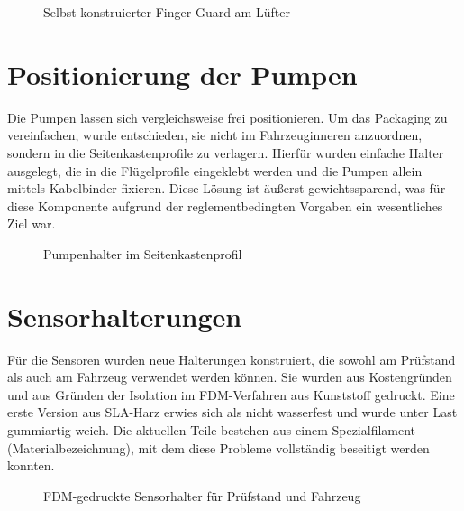 \begin{figure}[htbp]
    \centering
    \caption{Selbst konstruierter Finger Guard am Lüfter}
    \label{fig:finger_guard}
\end{figure}

\section{Positionierung der Pumpen}
\label{sec:pumpen_position}

Die Pumpen lassen sich vergleichsweise frei positionieren. Um das Packaging
zu vereinfachen, wurde entschieden, sie nicht im Fahrzeuginneren
anzuordnen, sondern in die Seitenkastenprofile zu verlagern. Hierfür wurden
einfache Halter ausgelegt, die in die Flügelprofile eingeklebt werden und
die Pumpen allein mittels Kabelbinder fixieren. Diese Lösung ist
äußerst gewichtssparend, was für diese Komponente aufgrund der
reglementbedingten Vorgaben ein wesentliches Ziel war.

\begin{figure}[htbp]
    \centering
    \caption{Pumpenhalter im Seitenkastenprofil}
    \label{fig:pumpenhalter}
\end{figure}

\section{Sensorhalterungen}
\label{sec:sensorhalterungen}

Für die Sensoren wurden neue Halterungen konstruiert, die sowohl am
Prüfstand als auch am Fahrzeug verwendet werden können. Sie wurden aus
Kostengründen und aus Gründen der Isolation im FDM-Verfahren aus Kunststoff
gedruckt. Eine erste Version aus SLA-Harz erwies sich als nicht wasserfest
und wurde unter Last gummiartig weich. Die aktuellen Teile bestehen aus
einem Spezialfilament (Materialbezeichnung), mit dem diese Probleme
vollständig beseitigt werden konnten.

\begin{figure}[htbp]
    \centering
    \caption{FDM-gedruckte Sensorhalter für Prüfstand und Fahrzeug}
    \label{fig:sensorhalter}
\end{figure}

